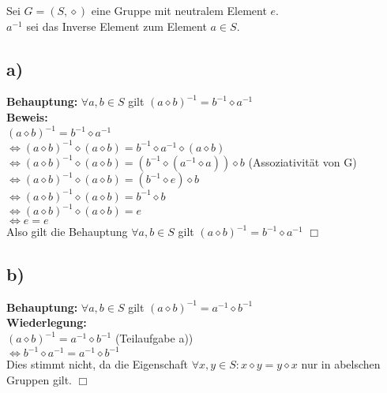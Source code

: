 \documentclass[paper = a4, ngerman]{scrartcl}
\begin{document}
	Sei $G = (S,\diamond)$ eine Gruppe mit neutralem Element $e$.\\
	$a^{-1}$ sei das Inverse Element zum Element $a \in S$.\\
	
	\subsection*{a)}
	\textbf{Behauptung:} $\forall a,b \in S$ gilt $ (a \diamond b)^{-1} = b^{-1} \diamond a^{-1}$\\
	
	\textbf{Beweis:}\\
	$ (a \diamond b)^{-1} = b^{-1} \diamond a^{-1}$\\
	$\Leftrightarrow (a \diamond b)^{-1} \diamond (a \diamond b)= b^{-1} \diamond a^{-1} \diamond(a \diamond b)$\\
	$\Leftrightarrow (a \diamond b)^{-1} \diamond (a \diamond b)= (b^{-1} \diamond (a^{-1} \diamond a)) \diamond b$ \hspace{10mm} (Assoziativität von G)\\
	$\Leftrightarrow (a \diamond b)^{-1} \diamond (a \diamond b)= (b^{-1} \diamond e) \diamond b$\\
	$\Leftrightarrow (a \diamond b)^{-1} \diamond (a \diamond b)= b^{-1} \diamond b$\\
	$\Leftrightarrow (a \diamond b)^{-1} \diamond (a \diamond b)= e$\\
	$\Leftrightarrow e= e$\\
	
	Also gilt die Behauptung $\forall a,b \in S$ gilt $ (a \diamond b)^{-1} = b^{-1} \diamond a^{-1}$
	\hfill$\Box$\\
	
	\subsection*{b)}
	\textbf{Behauptung:} $\forall a,b \in S$ gilt $ (a \diamond b)^{-1} = a^{-1} \diamond b^{-1}$\\
	
	\textbf{Wiederlegung:}\\
	$ (a \diamond b)^{-1} = a^{-1} \diamond b^{-1}$  (Teilaufgabe a))\\
	$\Leftrightarrow b^{-1} \diamond a^{-1} = a^{-1} \diamond b^{-1}$\\
	
	Dies stimmt nicht, da die Eigenschaft $\forall x, y \in S: x \diamond y = y \diamond x$ nur in abelschen Gruppen gilt.
	\hfill$\Box$\\
		
\end{document}
